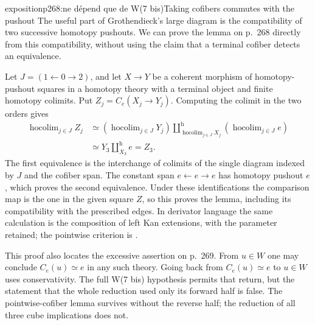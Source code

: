 \begin{dcomment}{exposition}{p268:ne dépend que de W(7 bis)}{Taking cofibers commutes with the pushout}
The useful part of Grothendieck's large diagram is the compatibility of two successive homotopy pushouts. We can prove the lemma on p.~268 directly from this compatibility, without using the claim that a terminal cofiber detects an equivalence.

Let $J=(1\leftarrow0\to2)$, and let $X\to Y$ be a coherent morphism of homotopy-pushout squares in a homotopy theory with a terminal object and finite homotopy colimits. Put $Z_j=C_e(X_j\to Y_j)$. Computing the colimit in the two orders gives
\[
\begin{aligned}
 \mathop{\mathrm{hocolim}}_{j\in J} Z_j
 &\simeq
 \left(\mathop{\mathrm{hocolim}}_{j\in J}Y_j\right)
 \amalg^{\mathrm h}_{\mathop{\mathrm{hocolim}}_{j\in J}X_j}
 \left(\mathop{\mathrm{hocolim}}_{j\in J} e\right)\\
 &\simeq Y_3\amalg^{\mathrm h}_{X_3}e=Z_3.
\end{aligned}
\]
The first equivalence is the interchange of colimits of the single diagram indexed by $J$ and the cofiber span. The constant span $e\leftarrow e\to e$ has homotopy pushout $e$, which proves the second equivalence. Under these identifications the comparison map is the one in the given square $Z$, so this proves the lemma, including its compatibility with the prescribed edges. In derivator language the same calculation is the composition of left Kan extensions, with the parameter retained; the pointwise criterion is \citet[Corollary~3.14]{Groth2013}.

This proof also locates the excessive assertion on p.~269. From $u\in W$ one may conclude $C_e(u)\simeq e$ in any such theory. Going back from $C_e(u)\simeq e$ to $u\in W$ uses conservativity. The full W(7 bis) hypothesis permits that return, but the statement that the whole reduction used only its forward half is false. The pointwise-cofiber lemma survives without the reverse half; the reduction of all three cube implications does not.
\end{dcomment}

